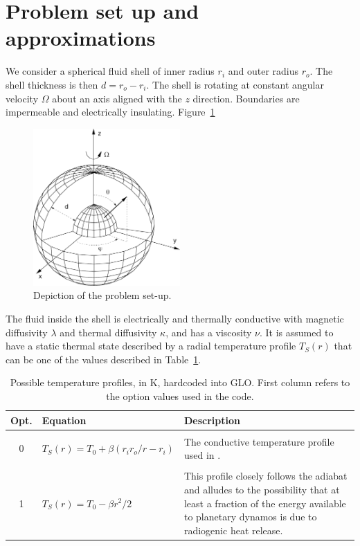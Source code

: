 \documentclass[a4paper,10pt]{book}
\begin{document}
\section{Problem set up and approximations}
\label{s:problemSetup}
We consider a spherical fluid shell of inner radius $r_i$ and outer radius
$r_o$. The shell thickness is then $d = r_o - r_i$. The shell is rotating at
constant angular velocity $\Omega$ about an axis aligned with the $z$ direction.
Boundaries are impermeable and electrically insulating. Figure~\ref{f:setup}
\begin{figure}[htb]
\centering
\includegraphics[width=0.5\textwidth]{figs/sphshell}
\caption{Depiction of the problem set-up.}
\label{f:setup}
\end{figure}

The fluid inside the shell is electrically and thermally conductive with
magnetic diffusivity $\lambda$ and thermal diffusivity $\kappa$, and has a
viscosity $\nu$. It is assumed to have a static thermal state described by a
radial temperature profile $T_S (r)$ that can be one of the values described in
Table~\ref{t:t_profiles}.
\begin{table}[htb]
\centering
\begin{tabular}{|c|lp{}|}\hline
 Opt. & Equation & Description\\\hline
  &                          & \\
 0&$T_S(r) = T_0 + \beta(r_i r_o/r - r_i)$ & The conductive temperature
 profile used in \citep{ChristensenEtAl01}.
 \\\hline
  &                          & \\
 1&$T_S(r) = T_0 - \beta r^2/2$    & This profile closely
follows the adiabat \citep{LabrossePoirier1997,DaviesGubbins2011} and alludes to
the possibility that at least a fraction of the energy available to planetary
dynamos is due to radiogenic heat release. \\ \hline
\end{tabular}
\caption{Possible temperature profiles, in K, hardcoded into GLO. First column
refers to the option values used in the code.}
\label{t:t_profiles}
\end{table}
\end{document}
